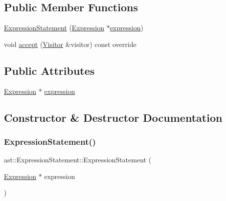 \subsection*{Public Member Functions}
\begin{DoxyCompactItemize}
\item 
\hyperlink{structast_1_1_expression_statement_ae52db4b78ca0e4117e9b12b375d57260}{Expression\+Statement} (\hyperlink{structast_1_1_expression}{Expression} $\ast$\hyperlink{structast_1_1_expression_statement_a1829b79e8621555588c547173ae94c00}{expression})
\item 
void \hyperlink{structast_1_1_expression_statement_ae1423385af60671e488b20ecbbc1f86e}{accept} (\hyperlink{structast_1_1_visitor}{Visitor} \&visitor) const override
\end{DoxyCompactItemize}
\subsection*{Public Attributes}
\begin{DoxyCompactItemize}
\item 
\hyperlink{structast_1_1_expression}{Expression} $\ast$ \hyperlink{structast_1_1_expression_statement_a1829b79e8621555588c547173ae94c00}{expression}
\end{DoxyCompactItemize}


\subsection{Constructor \& Destructor Documentation}
\mbox{\label{structast_1_1_expression_statement_ae52db4b78ca0e4117e9b12b375d57260}} 
\subsubsection{\texorpdfstring{Expression\+Statement()}{ExpressionStatement()}}
{\footnotesize\ttfamily ast\+::\+Expression\+Statement\+::\+Expression\+Statement (\begin{DoxyParamCaption}\item[{\hyperlink{structast_1_1_expression}{Expression} $\ast$}]{expression }\end{DoxyParamCaption})\hspace{0.3cm}{\ttfamily [inline]}}



